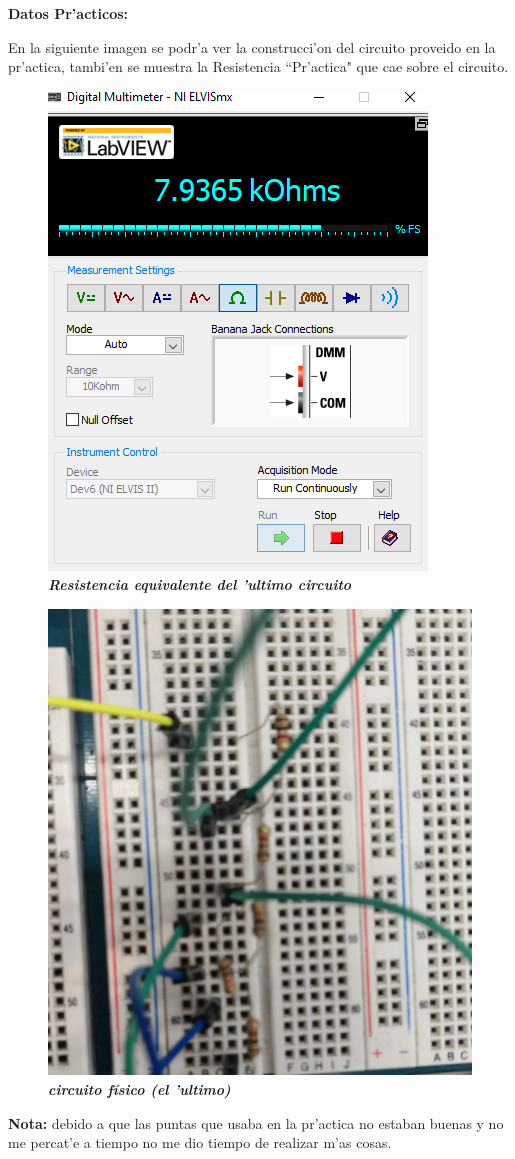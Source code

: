 \documentclass[11pt, letterpaper]{report}
\newenvironment{block}[1]{\hspace{-0.8 cm}\textbf{\Large #1}}{\vspace{3 mm}} %
\newcommand{\note}[1]{\small \textbf{Nota:} #1} %
\begin{document}
	\begin{block}{Datos Pr'acticos:}
	
	En la siguiente imagen se podr'a ver la construcci'on del circuito proveido en la pr'actica, tambi'en se muestra la Resistencia ``Pr'actica" que cae sobre el circuito.
	
	\begin{figure}[H]
	\hfill\includegraphics[width=.32\textwidth]{img/image.png}\hspace*{\fill}
	\caption{\textbf{\emph{Resistencia equivalente del 'ultimo circuito}}}
	\end{figure}
	
	\begin{figure}[H]
	\hfill\includegraphics[width=.32\textwidth]{img/circ.jpg} \hspace*{\fill}
	\caption{\textbf{\emph{circuito físico (el 'ultimo)}}}
	\end{figure}
	
	\note{debido a que las puntas que usaba en la pr'actica no estaban buenas y no me percat'e a tiempo no me dio tiempo de realizar m'as cosas.}
	
	\end{block}
	
\end{document}
